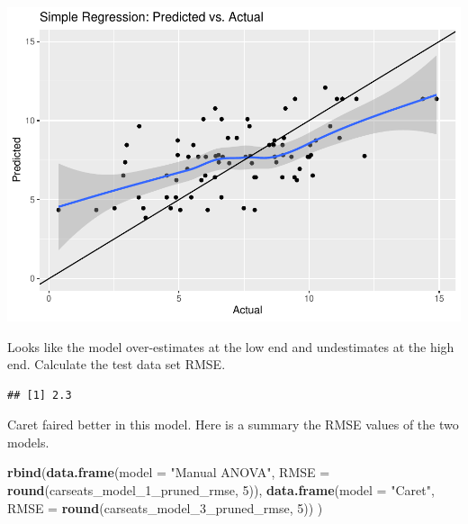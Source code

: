 \documentclass[
]{book}
\newenvironment{Shaded}{\begin{snugshade}}{\end{snugshade}}
\newcommand{\DataTypeTok}[1]{\textcolor[rgb]{0.13,0.29,0.53}{#1}}
\newcommand{\DecValTok}[1]{\textcolor[rgb]{0.00,0.00,0.81}{#1}}
\newcommand{\KeywordTok}[1]{\textcolor[rgb]{0.13,0.29,0.53}{\textbf{#1}}}
\newcommand{\NormalTok}[1]{#1}
\newcommand{\OperatorTok}[1]{\textcolor[rgb]{0.81,0.36,0.00}{\textbf{#1}}}
\newcommand{\StringTok}[1]{\textcolor[rgb]{0.31,0.60,0.02}{#1}}
\begin{document}
\includegraphics{data-sci_files/figure-latex/unnamed-chunk-111-1.pdf}

Looks like the model over-estimates at the low end and undestimates at the high end. Calculate the test data set RMSE.

\begin{Shaded}
\end{Shaded}

\begin{verbatim}
## [1] 2.3
\end{verbatim}

Caret faired better in this model. Here is a summary the RMSE values of the two models.

\begin{Shaded}
\begin{Highlighting}[]
\KeywordTok{rbind}\NormalTok{(}\KeywordTok{data.frame}\NormalTok{(}\DataTypeTok{model =} \StringTok{"Manual ANOVA"}\NormalTok{, }
                 \DataTypeTok{RMSE =} \KeywordTok{round}\NormalTok{(carseats_model_}\DecValTok{1}\NormalTok{_pruned_rmse, }\DecValTok{5}\NormalTok{)), }
      \KeywordTok{data.frame}\NormalTok{(}\DataTypeTok{model =} \StringTok{"Caret"}\NormalTok{, }
                 \DataTypeTok{RMSE =} \KeywordTok{round}\NormalTok{(carseats_model_}\DecValTok{3}\NormalTok{_pruned_rmse, }\DecValTok{5}\NormalTok{))}
\NormalTok{)}
\end{Highlighting}
\end{Shaded}
\end{document}
